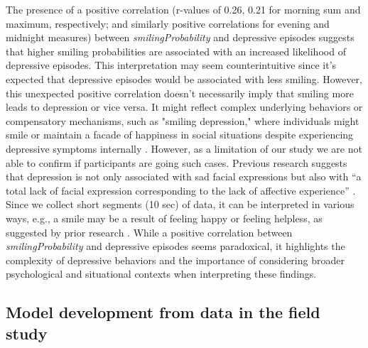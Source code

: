 The presence of a positive correlation (r-values of 0.26, 0.21 for morning sum and maximum, respectively; and similarly positive correlations for evening and midnight measures) between \textit{smilingProbability} and depressive episodes suggests that higher smiling probabilities are associated with an increased likelihood of depressive episodes. This interpretation may seem counterintuitive since it's expected that depressive episodes would be associated with less smiling. However, this unexpected positive correlation doesn't necessarily imply that smiling more leads to depression or vice versa. It might reflect complex underlying behaviors or compensatory mechanisms, such as "smiling depression," where individuals might smile or maintain a facade of happiness in social situations despite experiencing depressive symptoms internally \cite{vanswearingen1999specific}. However, as a limitation of our study we are not able to confirm if participants are going such cases. Previous research suggests that depression is not only associated with sad facial expressions but also with “a total lack of facial expression corresponding to the lack of affective experience” \cite{ellgring2007non}. Since we collect short segments (10 sec) of data, it can be interpreted in various ways, e.g., a smile may be a result of feeling happy or feeling helpless, as suggested by prior research \cite{song2020spectral}. While a positive correlation between \textit{smilingProbability} and depressive episodes seems paradoxical, it highlights the complexity of depressive behaviors and the importance of considering broader psychological and situational contexts when interpreting these findings.



\subsection{Model development from data in the field study } \label{RQ1}


